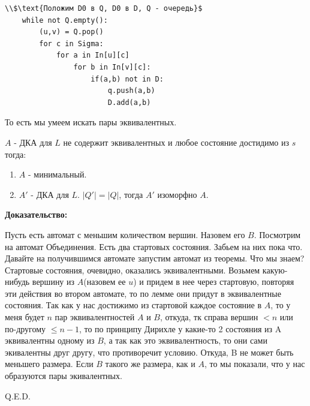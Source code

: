 \begin{lstlisting}[mathescape]
    \\$\text{Положим D0 в Q, D0 в D, Q - очередь}$
    while not Q.empty():
        (u,v) = Q.pop()
        for c in Sigma:
            for a in In[u][c]
                for b in In[v][c]:
                    if(a,b) not in D:
                        q.push(a,b)
                        D.add(a,b)
\end{lstlisting}

То есть мы умеем искать пары эквивалентных.

 $A$ - ДКА для $L$ не содержит эквивалентных и любое состояние достидимо из $s$ тогда:
\begin{enumerate}
    \item $A$ - минимальный.
    \item $A'$ - ДКА для $L$. $|Q'|=|Q|$, тогда $A'$ изоморфно $A$.
\end{enumerate}

\textbf{Доказательство:}

Пусть есть автомат с меньшим количеством вершин. Назовем его $B$. Посмотрим на автомат Объединения. Есть два стартовых состояния. Забьем на них пока что. Давайте на получившимся автомате запустим автомат из теоремы. Что мы знаем? Стартовые состояния, очевидно, оказались эквивалентными. Возьмем какую-нибудь вершину из $A$(назовем ее $u$) и придем в нее через стартовую, повторяя эти действия во втором автомате, то по лемме они придут в эквивалентные состояния. Так как у нас достижимо из стартовой каждое состояние в $A$, то у меня будет $n$ пар эквивалентностей $A$ и $B$, откуда, тк справа вершин $<n$ или по-другому $\leq n-1$, то по принципу Дирихле у какие-то 2 состояния из A эквивалентны одному из $B$, а так как это эквивалентность, то они сами экивалентны друг другу, что противоречит условию. Откуда, B не может быть меньшего размера. Если $B$ такого же размера, как и $A$, то мы показали, что у нас образуются пары экивалентных.

\hfill Q.E.D.


